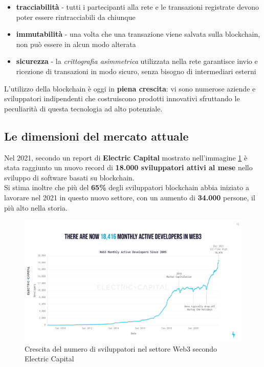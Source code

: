 \documentclass[12pt,a4paper]{report}
\begin{document}
\begin{itemize}
  \item \textbf{tracciabilità} - tutti i partecipanti alla rete e le transazioni registrate devono poter essere rintracciabili da chiunque
  \item \textbf{immutabilità} - una volta che una transazione viene salvata sulla blockchain, non può essere in alcun modo alterata
  \item \textbf{sicurezza} - la \textit{crittografia asimmetrica} utilizzata nella rete garantisce invio e ricezione di transazioni in modo sicuro, senza bisogno di intermediari esterni
\end{itemize}

\noindent L'utilizzo della blockchain è oggi in \textbf{piena crescita}: vi sono numerose aziende e sviluppatori indipendenti che costruiscono prodotti innovativi sfruttando le peculiarità di questa tecnologia ad alto potenziale.


\subsection{Le dimensioni del mercato attuale}

\noindent Nel 2021, secondo un report di \textbf{Electric Capital}\cite{web3_dev} mostrato nell'immagine \ref{fig:web3_dev} è stata raggiunto un nuovo record di \textbf{18.000 sviluppatori attivi al mese} nello sviluppo di software basati su blockchain. \\Si stima inoltre che più del \textbf{65\%} degli sviluppatori blockchain abbia iniziato a lavorare nel 2021 in questo nuovo settore, con un aumento di \textbf{34.000} persone, il più alto nella storia.

\begin{figure}[H]
  \includegraphics[scale=0.3]{web3_dev.png}
  \centering
  \caption{Crescita del numero di sviluppatori nel settore Web3 secondo Electric Capital}
  \label{fig:web3_dev}
\end{figure}
\end{document}
